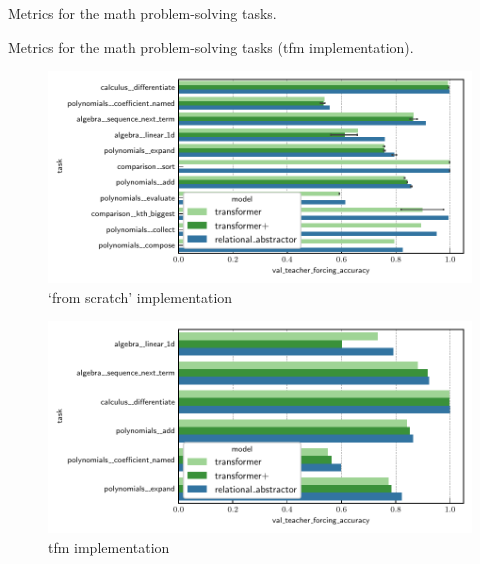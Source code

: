 \begin{table}[p]
    
    \caption{Metrics for the math problem-solving tasks.}\label{tab:math_metrics}
\end{table}

\begin{table}[p]
    
    \caption{Metrics for the math problem-solving tasks (tfm implementation).}\label{tab:math_tfm_metrics}
\end{table}

\begin{figure}
    \centering
    \includegraphics{figures/experiments/math_metrics.pdf}
    \caption{`from scratch' implementation}\label{fig:math_metrics}
\end{figure}

\begin{figure}
    \centering
    \includegraphics{figures/experiments/math_tfm_metrics.pdf}
    \caption{tfm implementation}\label{fig:tfm_math_metrics}
\end{figure}